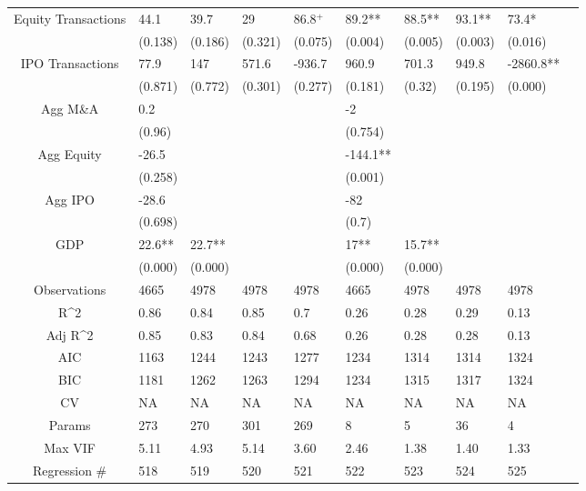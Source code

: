 \documentclass{article}
\begin{document}
\begin{table}[H]
\begin{tabular}{|clllllllll|}
  Equity Transactions & 44.1 & 39.7 & 29 & 86.8$^{+}$ & 89.2** & 88.5** & 93.1** & 73.4* & \\
   & (0.138) & (0.186) & (0.321) & (0.075) & (0.004) & (0.005) & (0.003) & (0.016) & \\
  IPO Transactions & 77.9 & 147 & 571.6 & -936.7 & 960.9 & 701.3 & 949.8 & -2860.8** & \\
   & (0.871) & (0.772) & (0.301) & (0.277) & (0.181) & (0.32) & (0.195) & (0.000) & \\
  Agg M\&A & 0.2 &  &  &  & -2 &  &  &  & \\
   & (0.96) &  &  &  & (0.754) &  &  &  & \\
  Agg Equity & -26.5 &  &  &  & -144.1** &  &  &  & \\
   & (0.258) &  &  &  & (0.001) &  &  &  & \\
  Agg IPO & -28.6 &  &  &  & -82 &  &  &  & \\
   & (0.698) &  &  &  & (0.7) &  &  &  & \\
  GDP & 22.6** & 22.7** &  &  & 17** & 15.7** &  &  & \\
   & (0.000) & (0.000) &  &  & (0.000) & (0.000) &  &  & \\
  \hline
 Observations & 4665 & 4978 & 4978 & 4978 & 4665 & 4978 & 4978 & 4978 & \\
  R^2 & 0.86 & 0.84 & 0.85 & 0.7 & 0.26 & 0.28 & 0.29 & 0.13 & \\
  Adj R^2 & 0.85 & 0.83 & 0.84 & 0.68 & 0.26 & 0.28 & 0.28 & 0.13 & \\
  AIC & 1163 & 1244 & 1243 & 1277 & 1234 & 1314 & 1314 & 1324 & \\
  BIC & 1181 & 1262 & 1263 & 1294 & 1234 & 1315 & 1317 & 1324 & \\
  CV & NA & NA & NA & NA & NA & NA & NA & NA & \\
  Params & 273 & 270 & 301 & 269 & 8 & 5 & 36 & 4 & \\
  Max VIF & 5.11 & 4.93 & 5.14 & 3.60 & 2.46 & 1.38 & 1.40 & 1.33 & \\
  Regression \# & 518 & 519 & 520 & 521 & 522 & 523 & 524 & 525 & \\
   \hline
\end{tabular}

\end{table}
\end{document}
